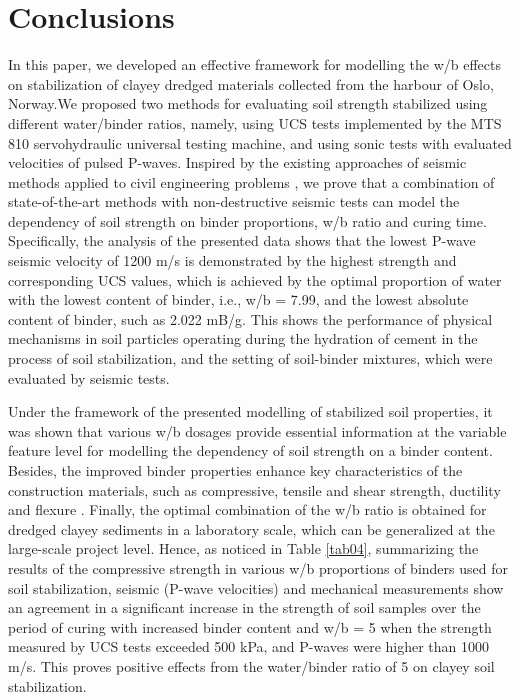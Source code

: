 \documentclass[sustainability,article,accept,pdftex,moreauthors]{Definitions/mdpi}
\begin{document}
{{%
\section{Conclusions}

In this paper, we developed an effective framework for modelling {the }w/b effects on stabilization of clayey dredged materials collected from the harbour of Oslo, Norway.\linebreak  We proposed two methods for evaluating soil strength stabilized using different water/binder ratios, namely, using UCS tests implemented by the MTS 810 servohydraulic universal testing machine, and using sonic tests with evaluated velocities of pulsed P-waves. Inspired by the existing approaches of seismic methods applied to civil engineering problems \cite{app13042745,HARRYPERSADDANIEL2022104557}, we prove that a combination of state-of-the-art methods with non-destructive seismic tests can model the dependency of soil strength on binder proportions, w/b ratio and curing time. {Specifically, the analysis of the presented data shows that the lowest P-wave seismic velocity of 1200 m/s is demonstrated by the highest strength and corresponding UCS values, which is achieved by the optimal proportion of water with the lowest content of binder, i.e., w/b = 7.99, and the lowest absolute content of binder, such as 2.022 mB/g. This shows the performance of physical mechanisms in soil particles operating during the hydration of cement in the process of soil stabilization, and the setting of soil-binder mixtures, which were evaluated by seismic tests. } %

Under the framework of the presented modelling of stabilized soil properties, it was shown that various w/b dosages provide essential information at the variable feature level for modelling {the }dependency of soil strength on {a }binder content. Besides, {the }improved binder properties enhance key characteristics of {the }construction materials, such as compressive, tensile and shear strength, ductility and flexure \cite{Reddy2022,Maheretal2008,MaherHo1994}. Finally, the optimal combination of {the }w/b ratio is obtained for dredged clayey sediments in {a} laboratory scale, which can be generalized at the {large-scale }project level. {Hence, as noticed in Table \ref{tab04}, summarizing the results of the compressive strength in various w/b proportions of binders used for soil stabilization, seismic (P-wave velocities) and mechanical measurements show an agreement in a significant increase in the strength of soil samples over the period of curing with increased binder content and w/b = 5 when the strength measured by UCS tests exceeded 500 kPa, and P-waves were higher than 1000 m/s. This proves positive effects from the water/binder ratio of 5 on clayey soil stabilization. } %

}}
\end{document}
